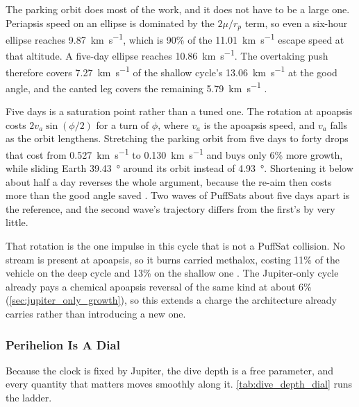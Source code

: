 \documentclass{article}
\begin{document}
The parking orbit does most of the work, and it does not have to be a large one. Periapsis speed on an ellipse is dominated by the $2\mu/r_p$ term, so even a six-hour ellipse reaches \SI{9.87}{\kilo\meter\per\second}, which is 90\% of the \SI{11.01}{\kilo\meter\per\second} escape speed at that altitude. A five-day ellipse reaches \SI{10.86}{\kilo\meter\per\second}. The overtaking push therefore covers \SI{7.27}{\kilo\meter\per\second} of the shallow cycle's \SI{13.06}{\kilo\meter\per\second} at the good angle, and the canted leg covers the remaining \SI{5.79}{\kilo\meter\per\second} \cite{Katz_aim_is_all_you_need_2025}.

Five days is a saturation point rather than a tuned one. The rotation at apoapsis costs $2v_a\sin(\phi/2)$ for a turn of $\phi$, where $v_a$ is the apoapsis speed, and $v_a$ falls as the orbit lengthens. Stretching the parking orbit from five days to forty drops that cost from \SI{0.527}{\kilo\meter\per\second} to \SI{0.130}{\kilo\meter\per\second} and buys only 6\% more growth, while sliding Earth \SI{39.43}{\degree} around its orbit instead of \SI{4.93}{\degree}. Shortening it below about half a day reverses the whole argument, because the re-aim then costs more than the good angle saved \cite{Katz_aim_is_all_you_need_2025}. Two waves of PuffSats about five days apart is the reference, and the second wave's trajectory differs from the first's by very little.

That rotation is the one impulse in this cycle that is not a PuffSat collision. No stream is present at apoapsis, so it burns carried methalox, costing 11\% of the vehicle on the deep cycle and 13\% on the shallow one \cite{Katz_aim_is_all_you_need_2025}. The Jupiter-only cycle already pays a chemical apoapsis reversal of the same kind at about 6\% (\autoref{sec:jupiter_only_growth}), so this extends a charge the architecture already carries rather than introducing a new one.

\subsubsection{Perihelion Is A Dial}\label{sec:depth_dial}
Because the clock is fixed by Jupiter, the dive depth is a free parameter, and every quantity that matters moves smoothly along it. \autoref{tab:dive_depth_dial} runs the ladder.
\end{document}
